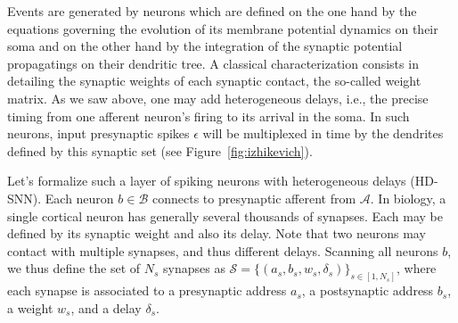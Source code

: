 \documentclass[runningheads]{llncs}
\newcommand{\presynaddr}{a} %
\newcommand{\postsynaddr}{b} %
\newcommand{\presynaddrspace}{\mathcal{A}} %
\newcommand{\postsynaddrspace}{\mathcal{B}} %
\newcommand{\synapse}{\mathcal{S}} %
\newcommand{\synapticweight}{w} %
\newcommand{\synapticdelay}{\delta} %
\newcommand{\ranksyn}{s} %
\newcommand{\Nsyn}{N_{s}} %
\newcommand{\event}{\epsilon} %
\begin{document}
Events are generated by neurons which are defined on the one hand by the equations governing the evolution of its membrane potential dynamics on their soma and on the other hand by the integration of the synaptic potential propagatings on their dendritic tree. A classical characterization consists in detailing the synaptic weights of each synaptic contact, the so-called weight matrix. As we saw above, one may add heterogeneous delays, i.e., the precise timing from one afferent neuron's firing to its arrival in the soma. %
In such neurons, %
input presynaptic spikes $\event$ will be multiplexed in time by the dendrites defined by this synaptic set (see Figure~\ref{fig:izhikevich}). %

Let's formalize such a layer of spiking neurons with heterogeneous delays (HD-SNN). Each neuron $\postsynaddr \in \postsynaddrspace$  connects to presynaptic afferent from $\presynaddrspace$. In biology, a single cortical neuron has generally several thousands of synapses. Each may be defined by its synaptic weight and also its delay. %
Note that two neurons may contact with multiple synapses, and thus different delays. Scanning all neurons $\postsynaddr$, we thus define the set of $\Nsyn$ synapses  as  $\synapse = \{(\presynaddr_\ranksyn, \postsynaddr_\ranksyn, \synapticweight_\ranksyn, \synapticdelay_\ranksyn)\}_{\ranksyn \in [1,\Nsyn]}$, where each synapse is associated to a presynaptic address $\presynaddr_\ranksyn$, a postsynaptic address $\postsynaddr_\ranksyn$,  a weight $\synapticweight_\ranksyn$, and a delay $\synapticdelay_\ranksyn$. 
\end{document}
